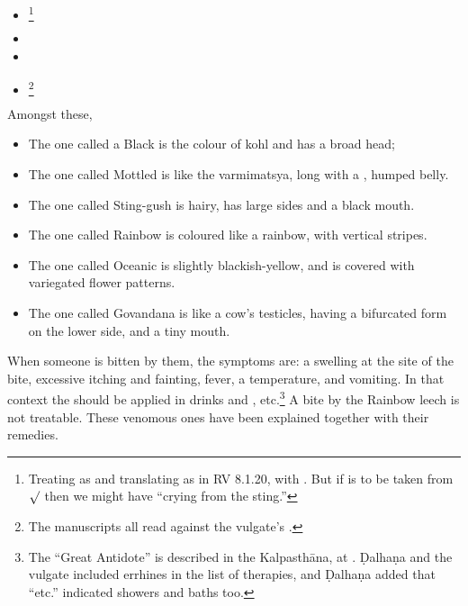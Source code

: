 \begin{translation}
\begin{itemize}
    \item {}\footnote{Treating  as
     and translating as in RV 8.1.20, with \citet[1023, verse 20
    and cf.\ commentary]{jami-2014}. But if  is to be taken from
    $\surd$ then we might have “crying from the sting.”}
    
    \item {}
    \item {}
    \item {}\footnote{The manuscripts all read 
     against the vulgate's .}
\end{itemize}
Amongst these, 
\begin{itemize}
    \item The one called a Black is the colour of kohl and has a broad head;

    \item The one called Mottled is like the \gls{varmimatsya}, long with a
, humped belly.
    
    \item  The one called Sting-gush is hairy, has large sides and a black mouth.
    
    \item  The one called Rainbow is coloured like a rainbow, with vertical stripes.
    
    \item  The one called Oceanic is slightly blackish-yellow, and is covered with
    variegated flower patterns. 
    
    \item The one called Govandana is like a cow's testicles, having a bifurcated form 
    on the lower side, and a tiny mouth. 
       
\end{itemize}
When someone is bitten by them, the symptoms are: a swelling at the site of
the bite, excessive itching and fainting, fever, a temperature, and
vomiting. In that context the  should be
applied in drinks and , etc.\footnote{The “Great Antidote” is
    described in the Kalpasthāna, at .  Ḍalhaṇa and the 
    vulgate included errhines in the list of therapies, and Ḍalhaṇa added that “etc.” 
    indicated showers and baths too.} A bite by the
    Rainbow leech is not treatable.  These venomous ones have been explained
    together with their remedies.


\end{translation}

